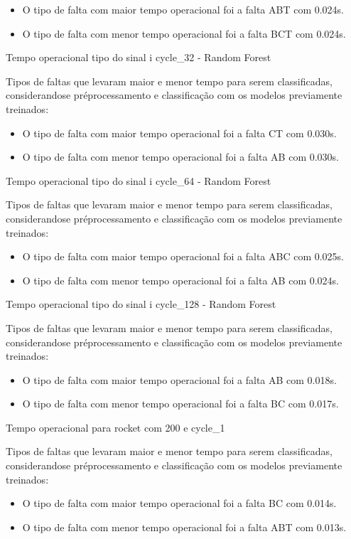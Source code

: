 \begin{itemize}
\item O tipo de falta com maior tempo operacional foi a falta ABT com 0.024s.
\item O tipo de falta com menor tempo operacional foi a falta BCT com 0.024s.
\end{itemize}
Tempo operacional tipo do sinal i cycle_32 - Random Forest
\item Tipos de faltas que levaram maior e menor tempo para serem classificadas, considerando\hyph se pré\hyph processamento e classificação com os modelos previamente treinados:
\begin{itemize}
\item O tipo de falta com maior tempo operacional foi a falta CT com 0.030s.
\item O tipo de falta com menor tempo operacional foi a falta AB com 0.030s.
\end{itemize}
Tempo operacional tipo do sinal i cycle_64 - Random Forest
\item Tipos de faltas que levaram maior e menor tempo para serem classificadas, considerando\hyph se pré\hyph processamento e classificação com os modelos previamente treinados:
\begin{itemize}
\item O tipo de falta com maior tempo operacional foi a falta ABC com 0.025s.
\item O tipo de falta com menor tempo operacional foi a falta AB com 0.024s.
\end{itemize}
Tempo operacional tipo do sinal i cycle_128 - Random Forest
\item Tipos de faltas que levaram maior e menor tempo para serem classificadas, considerando\hyph se pré\hyph processamento e classificação com os modelos previamente treinados:
\begin{itemize}
\item O tipo de falta com maior tempo operacional foi a falta AB com 0.018s.
\item O tipo de falta com menor tempo operacional foi a falta BC com 0.017s.
\end{itemize}
Tempo operacional para rocket com 200 e cycle_1
\item Tipos de faltas que levaram maior e menor tempo para serem classificadas, considerando\hyph se pré\hyph processamento e classificação com os modelos previamente treinados:
\begin{itemize}
\item O tipo de falta com maior tempo operacional foi a falta BC com 0.014s.
\item O tipo de falta com menor tempo operacional foi a falta ABT com 0.013s.
\end{itemize}
